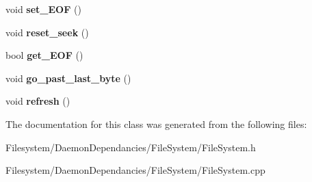 \begin{DoxyCompactItemize}
void {\bfseries set\+\_\+\+E\+OF} ()
\item 
\mbox{\label{classFileOpen_a1008411faf6df97c71d0ac0a867fce11}} 
void {\bfseries reset\+\_\+seek} ()
\item 
\mbox{\label{classFileOpen_afc9043c99b42afaaa5f1712f5a45e066}} 
bool {\bfseries get\+\_\+\+E\+OF} ()
\item 
\mbox{\label{classFileOpen_a966a424badc21c4cfc9b80854a052acb}} 
void {\bfseries go\+\_\+past\+\_\+last\+\_\+byte} ()
\item 
\mbox{\label{classFileOpen_ac10189670f476050bc3fdb44d74dcb33}} 
void {\bfseries refresh} ()
\end{DoxyCompactItemize}


The documentation for this class was generated from the following files\+:\begin{DoxyCompactItemize}
\item 
Filesystem/\+Daemon\+Dependancies/\+File\+System/File\+System.\+h\item 
Filesystem/\+Daemon\+Dependancies/\+File\+System/File\+System.\+cpp\end{DoxyCompactItemize}
